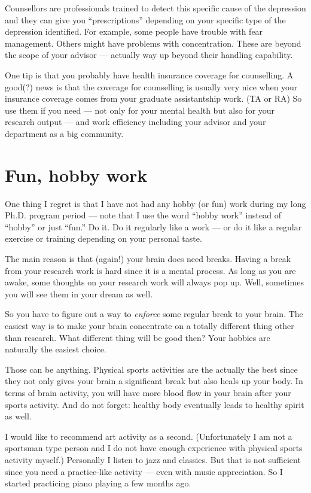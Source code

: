 \documentclass[11pt]{article}
\begin{document}
Counsellors are professionals trained to detect this specific cause of the
depression and they can give you ``prescriptions'' depending on your specific
type of the depression identified. For example, some people have trouble with
fear management. Others might have problems with concentration. These are
beyond the scope of your advisor --- actually way up beyond their handling
capability.

One tip is that you probably have health insurance coverage for counselling. A
good(?) news is that the coverage for counselling is usually very nice when
your insurance coverage comes from your graduate assistantship work. (TA or
RA) So use them if you need --- not only for your mental health but also for
your research output --- and work efficiency including your advisor and
your department as a big community.

\section{Fun, hobby work}

One thing I regret is that I have not had any hobby (or fun) work during my
long Ph.D. program period --- note that I use the word ``hobby work'' instead
of ``hobby'' or just ``fun.'' Do it. Do it regularly like a work --- or do it
like a regular exercise or training depending on your personal taste.

The main reason is that (again!) your brain does need breaks. Having a break
from your research work is hard since it is a mental process. As long as you
are awake, some thoughts on your research work will always pop up. Well,
sometimes you will see them in your dream as well. 

So you have to figure out a way to \emph{enforce} some regular break to your
brain. The easiest way is to make your brain concentrate on a totally
different thing other than research.  What different thing will be good then?
Your hobbies are naturally the easiest choice. 

Those can be anything. Physical sports activities are the actually the best
since they not only gives your brain a significant break but also heals up
your body. In terms of brain activity, you will have more blood flow in your
brain after your sports activity. And do not forget: healthy body eventually
leads to healthy spirit as well. 

I would like to recommend art activity as a second. (Unfortunately I am not a
sportsman type person and I do not have enough experience with physical sports
activity myself.) Personally I listen to jazz and classics. But that is not
sufficient since you need a practice-like activity --- even with music
appreciation. So I started practicing piano playing a few months ago. 
\end{document}
